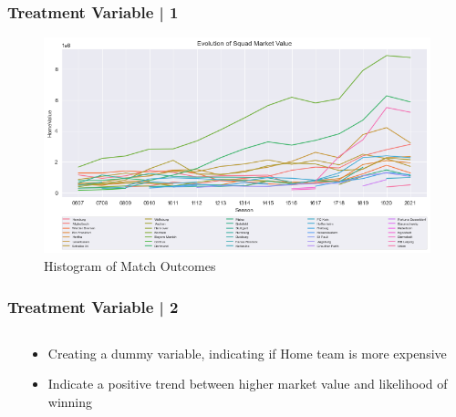 \documentclass{beamer}
\begin{document}
\begin{frame}
\frametitle{Treatment Variable | 1}

\begin{figure}
	\centering
	\includegraphics[scale=0.45]{img/MarkVal2Kopie.png}
	\caption{Histogram of Match Outcomes}
\end{figure}

\end{frame}


\begin{frame}
\frametitle{Treatment Variable | 2}

	\begin{columns}[T]
		\begin{column}{.4\textwidth}			
			\begin{table}[ht]
				\centering
				\caption{Mean of treatment for match outcome}
			\end{table}
		\end{column}

		\begin{column}{.45\textwidth}
			\begin{itemize}
				\item Creating a dummy variable, indicating if Home team is more expensive 
				\item Indicate a positive trend between higher market value and likelihood of winning
			\end{itemize}
		\end{column}
	\end{columns}

\end{frame}
\end{document}
